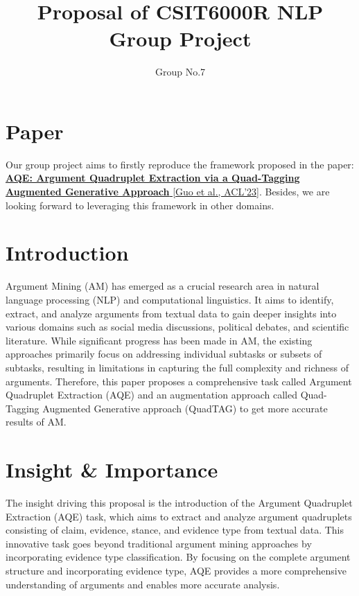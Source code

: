 \documentclass{article}
\title{Proposal of CSIT6000R NLP Group Project}
\author{
    Group No.7
}
\date{}
\begin{document}
\maketitle

\section{Paper}

\noindent

Our group project aims to firstly reproduce the framework proposed in the paper: \href{https://aclanthology.org/2023.findings-acl.59/}{\textbf{AQE: Argument Quadruplet Extraction via a Quad-Tagging Augmented Generative Approach} [Guo et al., ACL’23]}. Besides, we are looking forward to leveraging this framework in other domains.

\section{Introduction}

\noindent

Argument Mining (AM) has emerged as a crucial research area in natural language processing (NLP) and computational linguistics. It aims to identify, extract, and analyze arguments from textual data to gain deeper insights into various domains such as social media discussions, political debates, and scientific literature. While significant progress has been made in AM, the existing approaches primarily focus on addressing individual subtasks or subsets of subtasks, resulting in limitations in capturing the full complexity and richness of arguments. Therefore, this paper proposes a comprehensive task called Argument Quadruplet Extraction (AQE) and an augmentation approach called Quad-Tagging Augmented Generative approach (QuadTAG) to get more accurate results of AM.

\section{Insight \& Importance}

\noindent

The insight driving this proposal is the introduction of the Argument Quadruplet Extraction (AQE) task, which aims to extract and analyze argument quadruplets consisting of claim, evidence, stance, and evidence type from textual data. This innovative task goes beyond traditional argument mining approaches by incorporating evidence type classification. By focusing on the complete argument structure and incorporating evidence type, AQE provides a more comprehensive understanding of arguments and enables more accurate analysis.
\end{document}
